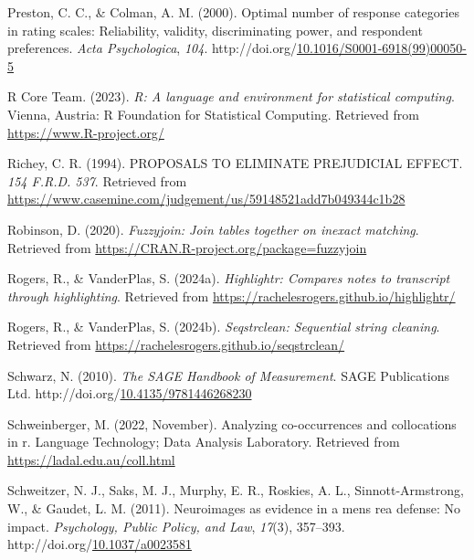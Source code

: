 \documentclass[print]{nuthesis}
\newlength{\cslhangindent}
\newenvironment{CSLReferences}[2]%
{\setlength{\parindent}{0pt}%
\everypar{\setlength{\hangindent}{\cslhangindent}}\ignorespaces}%
{\par}
\begin{document}
\begin{CSLReferences}{1}{0}
\leavevmode{}%
Preston, C. C., \& Colman, A. M. (2000). Optimal number of response categories in rating scales: Reliability, validity, discriminating power, and respondent preferences. \emph{Acta Psychologica}, \emph{104}. http://doi.org/\href{https://doi.org/10.1016/S0001-6918(99)00050-5}{10.1016/S0001-6918(99)00050-5}

\leavevmode{}%
R Core Team. (2023). \emph{R: A language and environment for statistical computing}. Vienna, Austria: R Foundation for Statistical Computing. Retrieved from \url{https://www.R-project.org/}

\leavevmode{}%
Richey, C. R. (1994). PROPOSALS TO ELIMINATE PREJUDICIAL EFFECT. \emph{154 {F}.{R}.{D}. 537}. Retrieved from \url{https://www.casemine.com/judgement/us/59148521add7b049344c1b28}

\leavevmode{}%
Robinson, D. (2020). \emph{Fuzzyjoin: Join tables together on inexact matching}. Retrieved from \url{https://CRAN.R-project.org/package=fuzzyjoin}

\leavevmode{}%
Rogers, R., \& VanderPlas, S. (2024a). \emph{Highlightr: Compares notes to transcript through highlighting}. Retrieved from \url{https://rachelesrogers.github.io/highlightr/}

\leavevmode{}%
Rogers, R., \& VanderPlas, S. (2024b). \emph{Seqstrclean: Sequential string cleaning}. Retrieved from \url{https://rachelesrogers.github.io/seqstrclean/}

\leavevmode{}%
Schwarz, N. (2010). \emph{The {SAGE} {Handbook} of {Measurement}}. SAGE Publications Ltd. http://doi.org/\href{https://doi.org/10.4135/9781446268230}{10.4135/9781446268230}

\leavevmode{}%
Schweinberger, M. (2022, November). Analyzing co-occurrences and collocations in r. Language Technology; Data Analysis Laboratory. Retrieved from \url{https://ladal.edu.au/coll.html}

\leavevmode{}%
Schweitzer, N. J., Saks, M. J., Murphy, E. R., Roskies, A. L., Sinnott-Armstrong, W., \& Gaudet, L. M. (2011). Neuroimages as evidence in a mens rea defense: {No} impact. \emph{Psychology, Public Policy, and Law}, \emph{17}(3), 357--393. http://doi.org/\href{https://doi.org/10.1037/a0023581}{10.1037/a0023581}


\end{CSLReferences}
\end{document}
